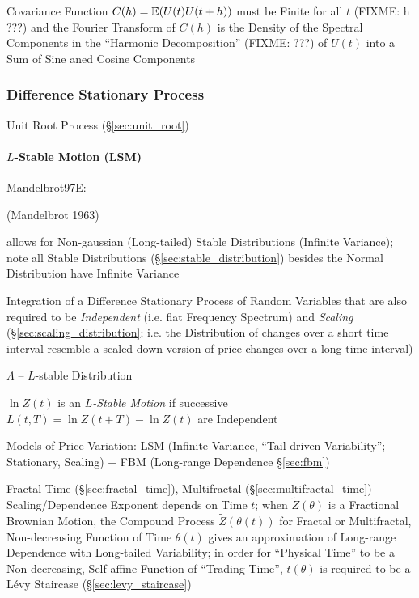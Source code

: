 Covariance Function $C(h) = \mathbb{E}(U(t) U(t + h))$ must be Finite for all $t$
(FIXME: h ???) and the Fourier Transform of $C(h)$ is the Density of the
Spectral Components in the ``Harmonic Decomposition'' (FIXME: ???) of $U(t)$
into a Sum of Sine aned Cosine Components



\subsubsection{Difference Stationary Process}\label{sec:difference_stationary}

Unit Root Process (\S\ref{sec:unit_root})



\paragraph{$L$-Stable Motion (LSM)}\label{sec:lsm}\hfill


Mandelbrot97E:

(Mandelbrot 1963)

allows for Non-gaussian (Long-tailed) Stable Distributions (Infinite Variance);
note all Stable Distributions (\S\ref{sec:stable_distribution}) besides the
Normal Distribution have Infinite Variance


Integration of a Difference Stationary Process of Random Variables that are
also required to be \emph{Independent} (i.e. flat Frequency Spectrum) and
\emph{Scaling} (\S\ref{sec:scaling_distribution}; i.e. the Distribution of
changes over a short time interval resemble a scaled-down version of price
changes over a long time interval)

$\Lambda$ -- $L$-stable Distribution

$\ln Z(t)$ is an \emph{$L$-Stable Motion} if successive
$L(t, T) = \ln Z(t + T) - \ln Z(t)$ are Independent

Models of Price Variation: LSM (Infinite Variance, ``Tail-driven Variability'';
Stationary, Scaling) + FBM (Long-range Dependence \S\ref{sec:fbm})

\fist Fractal Time (\S\ref{sec:fractal_time}), Multifractal
(\S\ref{sec:multifractal_time}) -- Scaling/Dependence Exponent depends on Time
$t$; when $\tilde{Z}(\theta)$ is a Fractional Brownian Motion, the Compound
Process $\tilde{Z}(\theta(t))$ for Fractal or Multifractal, Non-decreasing
Function of Time $\theta(t)$ gives an approximation of Long-range Dependence
with Long-tailed Variability; in order for ``Physical Time'' to be a
Non-decreasing, Self-affine Function of ``Trading Time'', $t(\theta)$ is
required to be a L\'evy Staircase (\S\ref{sec:levy_staircase})

